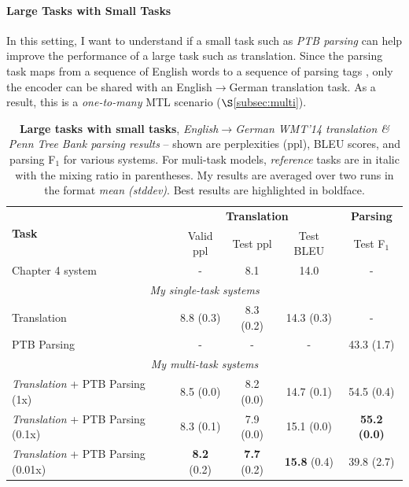 \paragraph{Large Tasks with Small Tasks} %
In this setting, I want to understand if a small task such as {\it
PTB parsing} can help improve the performance of a large task such as
translation.  Since the parsing task maps from a sequence of English
words to a sequence of parsing tags \citep{vinyals15grammar}, only the
encoder can be shared with an English$\rightarrow$German translation
task.  As a result, this is a {\it one-to-many}
MTL scenario ($\S$\ref{subsec:multi}).

\begin{table}[tbh!]
\centering
\begin{tabular}{l|c|c|c|c}
\multirow{ 2}{*}{\bf{Task}} & \multicolumn{3}{c|}{{\bf Translation}} &
\multicolumn{1}{c}{{\bf
Parsing}}\\
  \cline{2-5}
  & Valid ppl & Test ppl & Test BLEU & Test F$_1$ \\
  \hline
Chapter 4 system \citep{luong15attn} & - & 8.1 & 14.0 & -  \\
  \hline
\multicolumn{5}{c}{{\it My single-task systems}} \\
  \hline
Translation & 8.8 (0.3) & 8.3 (0.2) & 14.3 (0.3) & -\\
  \hline
PTB Parsing & - & - & - & 43.3 (1.7) \\
  \hline
\multicolumn{5}{c}{{\it My multi-task systems}} \\
  \hline
{\it Translation} + PTB Parsing (1x) &  8.5 (0.0) & 8.2 (0.0) & 14.7 (0.1) & 54.5 (0.4) \\
  \hline
{\it Translation} + PTB Parsing (0.1x) &  8.3 (0.1) & 7.9 (0.0) & 15.1 (0.0) &
{\bf 55.2 (0.0)}\\
  \hline
{\it Translation} + PTB Parsing (0.01x) &  {\bf 8.2} (0.2) & {\bf 7.7} (0.2) & {\bf
15.8} (0.4) & 39.8 (2.7) \\
\end{tabular}
\caption[Translation \& Penn Tree Bank parsing
results]{{\bf Large tasks with small tasks}, {\it English$\rightarrow$German WMT'14 translation \& Penn Tree Bank parsing results} --
shown are perplexities (ppl), BLEU scores, and parsing F$_1$ for various systems. For muli-task
models, {\it reference} tasks are in
italic with the mixing ratio in parentheses. My results are averaged over two
runs
in the format {\it mean (stddev)}. Best results are
highlighted in boldface.}
\label{t:big_small}
\end{table}

